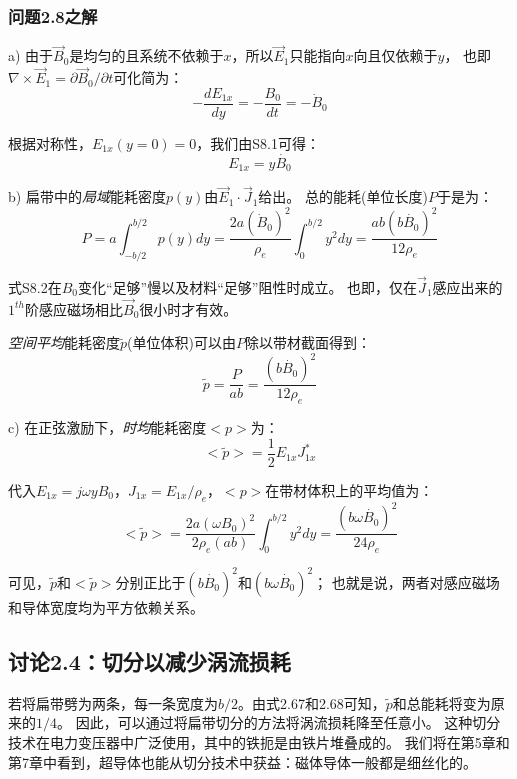 \subsubsection{问题2.8之解}
a) 由于$\vec{B}_0$是均匀的且系统不依赖于$x$，所以$\vec{E}_1$只能指向$x$向且仅依赖于$y$，
也即$\nabla\times \vec{E}_1=\partial \vec{B}_0/\partial t$可化简为：
\begin{equation*}
-\frac{dE_{1x}}{dy}=-\frac{B_0}{dt}=-\dot{B}_0 \tag{S8.1}
\end{equation*}

根据对称性，$E_{1x}(y=0)=0$，我们由S8.1可得：
\begin{equation*}
E_{1x}=y\dot{B_0}  \tag{2.66}
\end{equation*}

b) 扁带中的\textit{局域}能耗密度$p(y)$由$\vec{E}_1\cdot\vec{J}_1$给出。
总的能耗(单位长度)$P$于是为：
\begin{equation*}
P=a\int_{-b/2}^{b/2}p(y)dy=\frac{2a(\dot{B}_0)^2}{\rho_e}\int_{0}^{b/2}y^2dy=\frac{ab(b\dot{B_0})^2}{12\rho_e}  \tag{S8.2}
\end{equation*}

式S8.2在$B_0$变化``足够''慢以及材料``足够''阻性时成立。
也即，仅在$\vec{J}_1$感应出来的$1^{th}$阶感应磁场相比$\vec{B}_0$很小时才有效。

\textit{空间平均}能耗密度$\tilde{p}$(单位体积)可以由$P$除以带材截面得到：
\begin{equation*}
\tilde{p}=\frac{P}{ab}=\frac{(b\dot{B_0})^2}{12\rho_e}  \tag{2.67}
\end{equation*}

c) 在正弦激励下，\textit{时均}能耗密度$<p>$为：
\begin{equation*}
<\tilde{p}>=\frac{1}{2}E_{1x} J_{1x}^*  \tag{S8.3}
\end{equation*}

代入$E_{1x}=j\omega y B_0$，$J_{1x}=E_{1x}/\rho_e$，$<p>$在带材体积上的平均值为：
\begin{equation*}
<\tilde{p}>=\frac{2a(\omega B_0)^2}{2\rho_e (ab)}\int_{0}^{b/2} y^2 dy=\frac{(b\omega\dot{B_0})^2}{24\rho_e}  \tag{2.68}
\end{equation*}

可见，$\tilde{p}$和$<\tilde{p}>$分别正比于$(b\dot{B_0})^2$和$(b\omega \dot{B_0})^2$；
也就是说，两者对感应磁场和导体宽度均为平方依赖关系。


\subsection{讨论2.4：切分以减少涡流损耗}
若将扁带劈为两条，每一条宽度为$b/2$。由式2.67和2.68可知，$\tilde{p}$和总能耗将变为原来的$1/4$。
因此，可以通过将扁带切分的方法将涡流损耗降至任意小。
这种切分技术在电力变压器中广泛使用，其中的铁扼是由铁片堆叠成的。
我们将在第5章和第7章中看到，超导体也能从切分技术中获益：磁体导体一般都是细丝化的。


